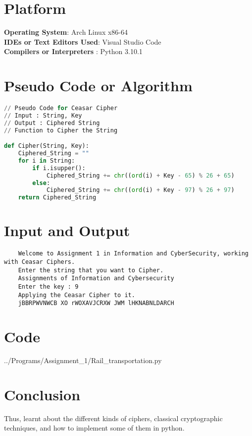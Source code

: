 \documentclass[11pt]{article}
\begin{document}
\begin{enumerate}
\end{enumerate}

\section{Platform}
\textbf{Operating System}: Arch Linux x86-64 \\
\textbf{IDEs or Text Editors Used}: Visual Studio Code\\
\textbf{Compilers or Interpreters} : Python 3.10.1\\

\section{Pseudo Code or Algorithm}
\begin{lstlisting}[language=Python]
// Pseudo Code for Ceasar Cipher
// Input : String, Key
// Output : Ciphered String
// Function to Cipher the String

def Cipher(String, Key):
	Ciphered_String = ""
	for i in String:
		if i.isupper():
			Ciphered_String += chr((ord(i) + Key - 65) % 26 + 65)
		else:
			Ciphered_String += chr((ord(i) + Key - 97) % 26 + 97)
	return Ciphered_String

\end{lstlisting}
\section{Input and Output}
\begin{verbatim}
	Welcome to Assignment 1 in Information and CyberSecurity, working with Ceasar Ciphers. 
	Enter the string that you want to Cipher. 
	Assignments of Information and Cybersecurity
	Enter the key : 9
	Applying the Ceasar Cipher to it. 
	jBBRPWVNWCB XO rWOXAVJCRXW JWM lHKNABNLDARCH
\end{verbatim}
\section{Code}



{../Programs/Assignment_1/Rail_transportation.py}
\section{Conclusion}
Thus, learnt about the different kinds of ciphers, classical cryptographic techniques, and how to implement some of them in python.
\clearpage
\end{document}
